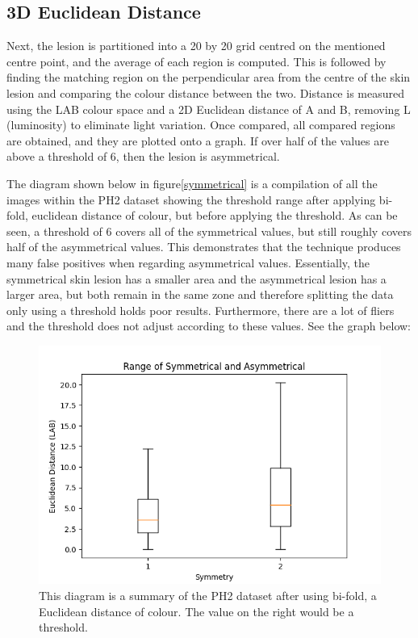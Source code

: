 \subsection{3D Euclidean Distance}
Next, the lesion is partitioned into a 20 by 20 grid centred on the mentioned centre point, and the average of each region is computed. This is followed by finding the matching region on the perpendicular area from the centre of the skin lesion and comparing the colour distance between the two. Distance is measured using the LAB colour space and a 2D Euclidean distance of A and B, removing L (luminosity) to eliminate light variation. Once compared, all compared regions are obtained, and they are plotted onto a graph. If over half of the values are above a threshold of 6, then the lesion is asymmetrical.

The diagram shown below in figure\ref{symmetrical} is a compilation of all the images within the PH2 dataset showing the threshold range after applying bi-fold, euclidean distance of colour, but before applying the threshold. As can be seen, a threshold of 6 covers all of the symmetrical values, but still roughly covers half of the asymmetrical values. This demonstrates that the technique produces many false positives when regarding asymmetrical values.
Essentially, the symmetrical skin lesion has a smaller area and the asymmetrical lesion has a larger area, but both remain in the same zone and therefore splitting the data only using a threshold holds poor results. Furthermore, there are a lot of fliers and the threshold does not adjust according to these values. See the graph below:

\begin{figure} 
    \centering
    \includegraphics[scale=0.6]{images/symmetrical.png}
\caption{This diagram is a summary of the PH2 dataset after using bi-fold, a Euclidean distance of colour. The value on the right would be a threshold.}
\end{figure}\label{symmetrical}
    
